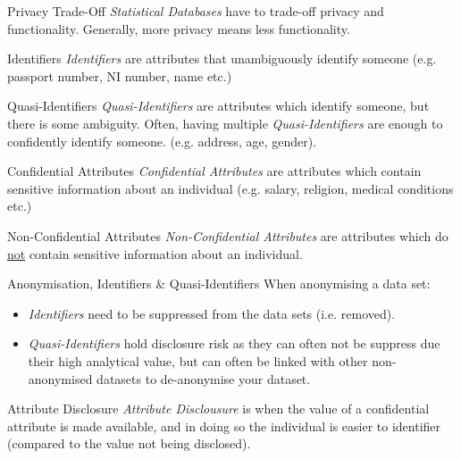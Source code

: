 \documentclass[11pt,a4paper]{article}
\begin{document}
  \begin{remark}{Privacy Trade-Off}
    \textit{Statistical Databases} have to trade-off privacy and functionality. Generally, more privacy means less functionality.
  \end{remark}

  \begin{definition}{Identifiers}
    \textit{Identifiers} are attributes that unambiguously identify someone (e.g. passport number, NI number, name etc.)
  \end{definition}

  \begin{definition}{Quasi-Identifiers}
    \textit{Quasi-Identifiers} are attributes which identify someone, but there is some ambiguity. Often, having multiple \textit{Quasi-Identifiers} are enough to confidently identify someone. (e.g. address, age, gender).
  \end{definition}

  \begin{definition}{Confidential Attributes}
    \textit{Confidential Attributes} are attributes which contain sensitive information about an individual (e.g. salary, religion, medical conditions etc.)
  \end{definition}

  \begin{definition}{Non-Confidential Attributes}
    \textit{Non-Confidential Attributes} are attributes which do \underline{not} contain sensitive information about an individual.
  \end{definition}

  \begin{remark}{Anonymisation, Identifiers \& Quasi-Identifiers}
    When anonymising a data set:
    \begin{itemize}
      \item \textit{Identifiers} need to be suppressed from the data sets (i.e. removed).
      \item \textit{Quasi-Identifiers} hold disclosure risk as they can often not be suppress due their high analytical value, but can often be linked with other non-anonymised datasets to de-anonymise your dataset.
    \end{itemize}
  \end{remark}

  \begin{definition}{Attribute Disclosure}
    \textit{Attribute Disclousure} is when the value of a confidential attribute is made available, and in doing so the individual is easier to identifier (compared to the value not being disclosed).
  \end{definition}
\end{document}
